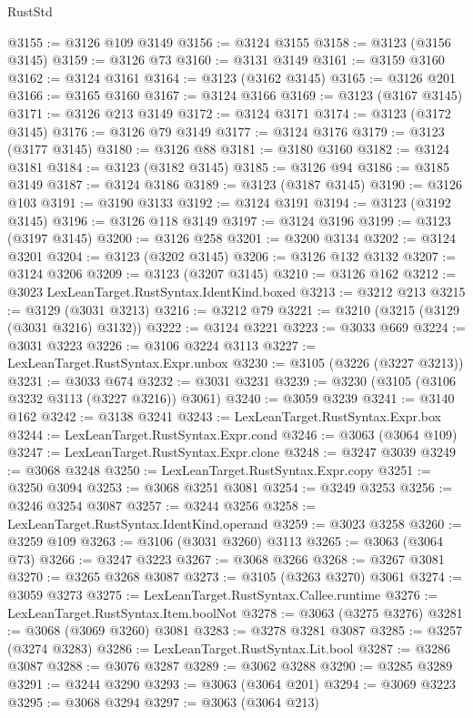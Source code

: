 \begin{lexlean}{RustStd}
\begin{coremodule}
@3155 := @3126 @109 @3149
@3156 := @3124 @3155
@3158 := @3123 (@3156 @3145)
@3159 := @3126 @73
@3160 := @3131 @3149
@3161 := @3159 @3160
@3162 := @3124 @3161
@3164 := @3123 (@3162 @3145)
@3165 := @3126 @201
@3166 := @3165 @3160
@3167 := @3124 @3166
@3169 := @3123 (@3167 @3145)
@3171 := @3126 @213 @3149
@3172 := @3124 @3171
@3174 := @3123 (@3172 @3145)
@3176 := @3126 @79 @3149
@3177 := @3124 @3176
@3179 := @3123 (@3177 @3145)
@3180 := @3126 @88
@3181 := @3180 @3160
@3182 := @3124 @3181
@3184 := @3123 (@3182 @3145)
@3185 := @3126 @94
@3186 := @3185 @3149
@3187 := @3124 @3186
@3189 := @3123 (@3187 @3145)
@3190 := @3126 @103
@3191 := @3190 @3133
@3192 := @3124 @3191
@3194 := @3123 (@3192 @3145)
@3196 := @3126 @118 @3149
@3197 := @3124 @3196
@3199 := @3123 (@3197 @3145)
@3200 := @3126 @258
@3201 := @3200 @3134
@3202 := @3124 @3201
@3204 := @3123 (@3202 @3145)
@3206 := @3126 @132 @3132
@3207 := @3124 @3206
@3209 := @3123 (@3207 @3145)
@3210 := @3126 @162
@3212 := @3023 LexLeanTarget.RustSyntax.IdentKind.boxed
@3213 := @3212 @213
@3215 := @3129 (@3031 @3213)
@3216 := @3212 @79
@3221 := @3210 (@3215 (@3129 (@3031 @3216) @3132))
@3222 := @3124 @3221
@3223 := @3033 @669
@3224 := @3031 @3223
@3226 := @3106 @3224 @3113
@3227 := LexLeanTarget.RustSyntax.Expr.unbox
@3230 := @3105 (@3226 (@3227 @3213))
@3231 := @3033 @674
@3232 := @3031 @3231
@3239 := @3230 (@3105 (@3106 @3232 @3113 (@3227 @3216)) @3061)
@3240 := @3059 @3239
@3241 := @3140 @162
@3242 := @3138 @3241
@3243 := LexLeanTarget.RustSyntax.Expr.box
@3244 := LexLeanTarget.RustSyntax.Expr.cond
@3246 := @3063 (@3064 @109)
@3247 := LexLeanTarget.RustSyntax.Expr.clone
@3248 := @3247 @3039
@3249 := @3068 @3248
@3250 := LexLeanTarget.RustSyntax.Expr.copy
@3251 := @3250 @3094
@3253 := @3068 @3251 @3081
@3254 := @3249 @3253
@3256 := @3246 @3254 @3087
@3257 := @3244 @3256
@3258 := LexLeanTarget.RustSyntax.IdentKind.operand
@3259 := @3023 @3258
@3260 := @3259 @109
@3263 := @3106 (@3031 @3260) @3113
@3265 := @3063 (@3064 @73)
@3266 := @3247 @3223
@3267 := @3068 @3266
@3268 := @3267 @3081
@3270 := @3265 @3268 @3087
@3273 := @3105 (@3263 @3270) @3061
@3274 := @3059 @3273
@3275 := LexLeanTarget.RustSyntax.Callee.runtime
@3276 := LexLeanTarget.RustSyntax.Item.boolNot
@3278 := @3063 (@3275 @3276)
@3281 := @3068 (@3069 @3260) @3081
@3283 := @3278 @3281 @3087
@3285 := @3257 (@3274 @3283)
@3286 := LexLeanTarget.RustSyntax.Lit.bool
@3287 := @3286 @3087
@3288 := @3076 @3287
@3289 := @3062 @3288
@3290 := @3285 @3289
@3291 := @3244 @3290
@3293 := @3063 (@3064 @201)
@3294 := @3069 @3223
@3295 := @3068 @3294
@3297 := @3063 (@3064 @213)

\end{coremodule}
\end{lexlean}
